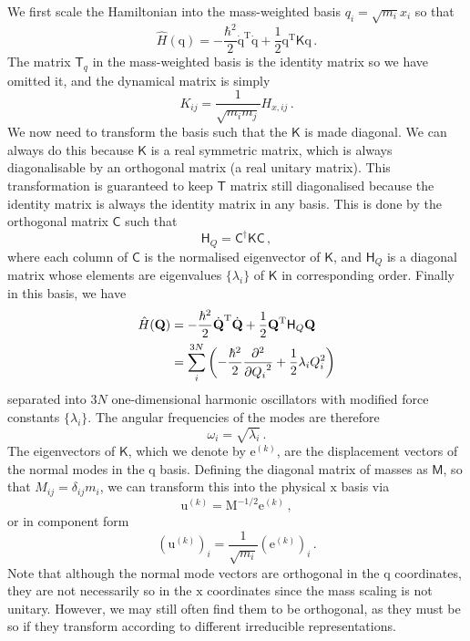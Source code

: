 \documentclass{article}
\theoremstyle{plain}\theoremheaderfont{\normalfont\itshape}\theorembodyfont{\rmfamily}\theoremseparator{.}\newtheorem*{rem}{Remark}\newtheorem*{ex}{Example}\newtheorem*{proof}{Proof}\newtheorem*{altp}{Alternative proof}
\theoremstyle{plain}\theoremheaderfont{\normalfont\bfseries}\theorembodyfont{\rmfamily}\theoremseparator{.}\newtheorem{thm}{Theorem}[section]\newtheorem{lem}[thm]{Lemma}\newtheorem{prop}[thm]{Proposition}\newtheorem*{cor}{Corollary}\newtheorem{defn}[thm]{Definition}\newtheorem{clm}[thm]{Claim}\newtheorem{clminproof}{Claim}
\theoremstyle{break}\theoremheaderfont{\normalfont\itshape}\theorembodyfont{\rmfamily}\theoremseparator{.\medskip}\newtheorem*{proofskip}{Proof}\newtheorem*{exs}{Examples}\newtheorem*{rems}{Remarks}
\theoremstyle{break}\theoremheaderfont{\normalfont\bfseries}\theorembodyfont{\rmfamily}\theoremseparator{.\medskip}\newtheorem{lemskip}[thm]{Lemma}\newtheorem{defnskip}[thm]{Definition}\newtheorem{propskip}[thm]{Proposition}\newtheorem{thmskip}[thm]{Theorem}
\numberwithin{equation}{section}
\newcommand{\tp}{^\mathrm{T}}
\newcommand{\pdv}[3][]{\frac{\partial^{#1} #2}{{\partial #3}^{#1}}}
\newcommand{\vb}[1]{\bm{\mathrm{#1}}}
\begin{document}
    We first scale the Hamiltonian into the mass-weighted basis \(q_i=\sqrt{m_i}x_i\) so that
    \begin{equation}
        \hat{H}(\vb{q})=-\frac{\hbar^2}{2}\dot{\vb{q}}\tp\dot{\vb{q}}+\frac{1}{2}\vb{q}\tp\mathsf{K}\vb{q}\,.
    \end{equation}
    The matrix \(\mathsf{T}_q\) in the mass-weighted basis is the identity matrix so we have omitted it, and the dynamical matrix is simply
    \begin{equation}
        K_{ij}=\frac{1}{\sqrt{m_im_j}}H_{x,ij}\,.
    \end{equation}
    We now need to transform the basis such that the \(\mathsf{K}\) is made diagonal. We can always do this because \(\mathsf{K}\) is a real symmetric matrix, which is always diagonalisable by an orthogonal matrix (a real unitary matrix). This transformation is guaranteed to keep \(\mathsf{T}\) matrix still diagonalised because the identity matrix is always the identity matrix in any basis. This is done by the orthogonal matrix \(\mathsf{C}\) such that
    \begin{equation}
        \mathsf{H}_Q=\mathsf{C}^\dagger\mathsf{K}\mathsf{C}\,,
    \end{equation} 
    where each column of \(\mathsf{C}\) is the normalised eigenvector of \(\mathsf{K}\), and \(\mathsf{H}_Q\) is a diagonal matrix whose elements are eigenvalues \(\{\lambda_i\}\) of \(\mathsf{K}\) in corresponding order. Finally in this basis, we have
    \begin{align}
        \hat{H}(\vb{Q})&=-\frac{\hbar^2}{2}\dot{\vb{Q}}\tp\dot{\vb{Q}}+\frac{1}{2}\vb{Q}\tp\mathsf{H}_Q\vb{Q}\notag\\
        &=\sum_{i}^{3N}\left(-\frac{\hbar^2}{2}\pdv[2]{}{Q_i}+\frac{1}{2}\lambda_i Q_i^2\right)\label{separated_harmonic_oscillators}
    \end{align}
    separated into \(3N\) one-dimensional harmonic oscillators with modified force constants \(\{\lambda_i\}\). The angular frequencies of the modes are therefore
    \begin{equation}
        \omega_i=\sqrt{\lambda_i}\,.
    \end{equation}
    The eigenvectors of \(\mathsf{K}\), which we denote by \(\vb{e}^{(k)}\), are the displacement vectors of the normal modes in the \(\vb{q}\) basis. Defining the diagonal matrix of masses as \(\mathsf{M}\), so that \(M_{ij}=\delta_{ij}m_i\), we can transform this into the physical \(\vb{x}\) basis via
    \begin{equation}
        \vb{u}^{(k)}=\mathrm{M}^{-1/2}\vb{e}^{(k)}\,,
    \end{equation}
    or in component form
    \begin{equation}
        (\vb{u}^{(k)})_i = \frac{1}{\sqrt{m_i}}(\vb{e}^{(k)})_i\,.
    \end{equation}
    Note that although the normal mode vectors are orthogonal in the \(\vb{q}\) coordinates, they are not necessarily so in the \(\vb{x}\) coordinates since the mass scaling is not unitary. However, we may still often find them to be orthogonal, as they must be so if they transform according to different irreducible representations.
\end{document}
